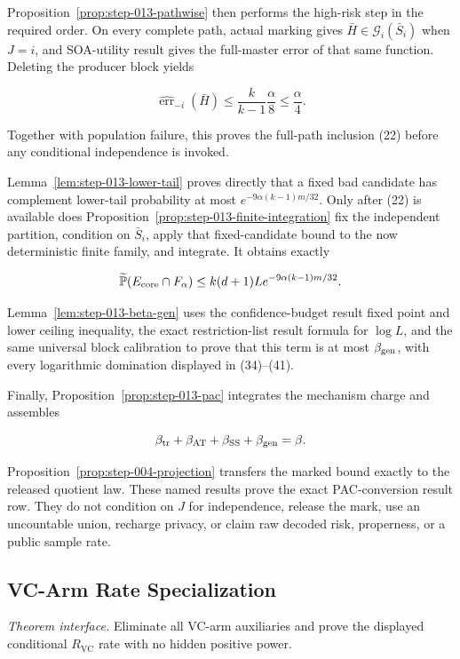 Proposition~\ref{prop:step-013-pathwise} then performs the high-risk step in
the required order. On every complete path,  actual marking gives
\(\bar H\in\mathcal G_i(\bar S_i)\) when \(J=i\), and SOA-utility result
gives the full-master error of that same function. Deleting the producer
block yields

\[
 \widehat{\operatorname{err}}_{-i}(\bar H)
 \leq\frac{k}{k-1}\frac\alpha8\leq\frac\alpha4.
\]

Together with population failure, this proves the full-path inclusion (22)
before any conditional independence is invoked.

Lemma~\ref{lem:step-013-lower-tail} proves directly that a fixed bad
candidate has complement lower-tail probability at most
\(e^{-9\alpha(k-1)m/32}\). Only after (22) is available does
Proposition~\ref{prop:step-013-finite-integration} fix the independent
partition, condition on \(\bar S_i\), apply that fixed-candidate bound to
the now deterministic finite family, and integrate. It obtains exactly

\[
 \widetilde{\mathbb P}(E_{\rm core}\cap F_\alpha)
 \leq k(d+1)L e^{-9\alpha(k-1)m/32}.
\]

Lemma~\ref{lem:step-013-beta-gen} uses the confidence-budget result fixed point and
lower ceiling inequality, the exact restriction-list result formula for \(\log L\), and
the same  universal block calibration to prove that this term is at most
\(\beta_{\rm gen}\), with every logarithmic domination displayed in
(34)--(41).

Finally, Proposition~\ref{prop:step-013-pac} integrates the 
mechanism charge and assembles

\[
 \beta_{\rm tr}+\beta_{\rm AT}+\beta_{\rm SS}+\beta_{\rm gen}=\beta.
\]

Proposition~\ref{prop:step-004-projection} transfers the marked
bound exactly to the released quotient law. These named results prove the
exact PAC-conversion result row. They do not condition on \(J\) for independence,
release the mark, use an uncountable union, recharge privacy, or claim raw
decoded risk, properness, or a public sample rate.



\subsection{VC-Arm Rate Specialization}\label{app:step_014}

\noindent\textit{Theorem interface.} Eliminate all VC-arm auxiliaries and prove the displayed   conditional \(R_{\mathrm{VC}}\) rate with no hidden positive power.

